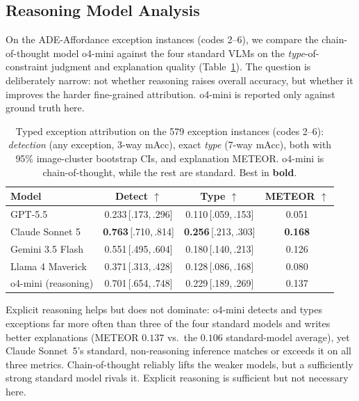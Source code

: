 \documentclass[runningheads]{llncs}
\begin{document}
\subsection{Reasoning Model Analysis}
\label{sec:reasoning}

On the ADE-Affordance exception instances (codes 2--6), we compare the chain-of-thought model o4-mini against the four standard VLMs on the \emph{type}-of-constraint judgment and explanation quality (Table~\ref{tab:reasoning}).
The question is deliberately narrow: not whether reasoning raises overall accuracy, but whether it improves the harder fine-grained attribution. 
o4-mini is reported only against ground truth here.

\begin{table}[t]
  \centering
  \footnotesize
  \caption{Typed exception attribution on the 579 exception instances (codes 2--6): \emph{detection} (any exception, 3-way mAcc), exact \emph{type} (7-way mAcc), both with 95\% image-cluster bootstrap CIs, and explanation METEOR. o4-mini is chain-of-thought, while the rest are standard. Best in \textbf{bold}.}
  \label{tab:reasoning}
  \begin{tabular}{lccc}
    \toprule
    Model & Detect $\uparrow$ & Type $\uparrow$ & METEOR $\uparrow$ \\
    \midrule
    GPT-5.5             & 0.233\,{\scriptsize[.173,\,.296]} & 0.110\,{\scriptsize[.059,\,.153]} & 0.051 \\
    Claude Sonnet 5     & \textbf{0.763}\,{\scriptsize[.710,\,.814]} & \textbf{0.256}\,{\scriptsize[.213,\,.303]} & \textbf{0.168} \\
    Gemini 3.5 Flash    & 0.551\,{\scriptsize[.495,\,.604]} & 0.180\,{\scriptsize[.140,\,.213]} & 0.126 \\
    Llama 4 Maverick    & 0.371\,{\scriptsize[.313,\,.428]} & 0.128\,{\scriptsize[.086,\,.168]} & 0.080 \\
    \midrule
    o4-mini (reasoning) & 0.701\,{\scriptsize[.654,\,.748]} & 0.229\,{\scriptsize[.189,\,.269]} & 0.137 \\
    \bottomrule
  \end{tabular}
\end{table}

Explicit reasoning helps but does not dominate: o4-mini detects and types exceptions far more often than three of the four standard models and writes better explanations (METEOR $0.137$ vs.\ the $0.106$ standard-model average), yet Claude Sonnet~5's standard, non-reasoning inference matches or exceeds it on all three metrics.
Chain-of-thought reliably lifts the weaker models, but a sufficiently strong standard model rivals it.
Explicit reasoning is sufficient but not necessary here.
\end{document}
